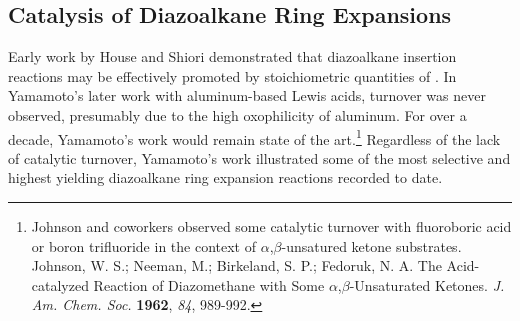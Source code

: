 \subsection{Catalysis of Diazoalkane Ring Expansions}
Early work by House and Shiori demonstrated that
diazoalkane insertion reactions may be effectively promoted by stoichiometric quantities of
.
In Yamamoto's later work with aluminum-based Lewis acids, turnover was never
observed, presumably due to the high oxophilicity of aluminum. For over a
decade, Yamamoto's work would remain state of the art.\footnote{Johnson and coworkers observed some catalytic turnover with fluoroboric acid or boron trifluoride in the context of $\alpha$,$\beta$-unsatured ketone substrates. {\frenchspacing
Johnson, W. S.; Neeman, M.; Birkeland, S. P.; Fedoruk, N. A. The Acid-catalyzed Reaction of
Diazomethane with Some $\alpha$,$\beta$-Unsaturated Ketones. \textit{J. Am. Chem. Soc.} \textbf{1962}, \textit{84}, 989-992.}} Regardless of the lack of catalytic turnover, Yamamoto's work
illustrated some of the most selective and highest yielding diazoalkane ring expansion reactions recorded to date.


